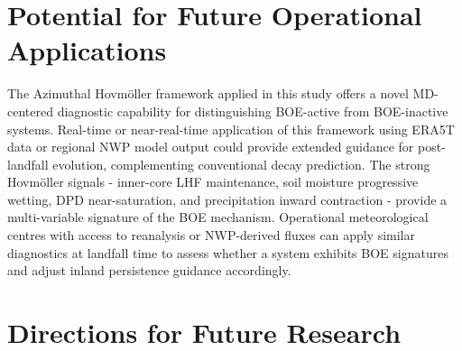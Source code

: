 \section{Potential for Future Operational Applications}
\label{sec:conclusions_operational}

The Azimuthal Hovmöller framework applied in this study offers a
novel MD-centered diagnostic capability for distinguishing BOE-active
from BOE-inactive systems. Real-time or near-real-time application of
this framework using ERA5T data or regional NWP model output could provide
extended guidance for post-landfall evolution, complementing conventional
decay prediction. The strong Hovmöller signals - inner-core LHF
maintenance, soil moisture progressive wetting, DPD near-saturation,
and precipitation inward contraction - provide a multi-variable
signature of the BOE mechanism. Operational meteorological centres
with access to reanalysis or NWP-derived fluxes can apply similar diagnostics at
landfall time to assess whether a system exhibits BOE signatures and
adjust inland persistence guidance accordingly.

\section{Directions for Future Research}
\label{sec:conclusions_future}

